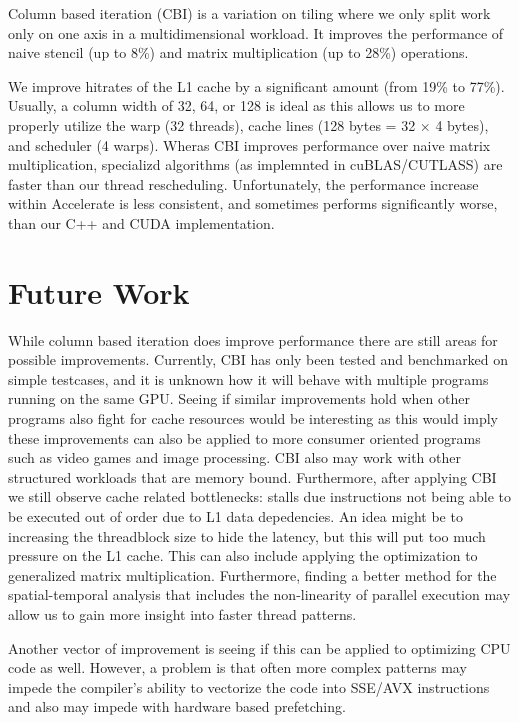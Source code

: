 Column based iteration (CBI) is a variation on tiling where we only split work only on one axis in a multidimensional workload. 
It improves the performance of naive stencil (up to 8\%) and matrix multiplication (up to 28\%) operations.

We improve hitrates of the L1 cache by a significant amount (from 19\% to 77\%).
Usually, a column width of 32, 64, or 128 is ideal as this allows us to more properly utilize the warp (32 threads), cache lines (128 bytes = 32 $\times$ 4 bytes), and scheduler (4 warps).
Wheras CBI improves performance over naive matrix multiplication, specializd algorithms (as implemnted in cuBLAS/CUTLASS) are faster than our thread rescheduling.
Unfortunately, the performance increase within Accelerate is less consistent, and sometimes performs significantly worse, than our C++ and CUDA implementation. 

\section{Future Work}
While column based iteration does improve performance there are still areas for possible improvements.
Currently, CBI has only been tested and benchmarked on simple testcases, and it is unknown how it will behave with multiple programs running on the same GPU.
Seeing if similar improvements hold when other programs also fight for cache resources would be interesting as this would imply these improvements can also be applied to more consumer oriented programs such as video games and image processing.
CBI also may work with other structured workloads that are memory bound.
Furthermore, after applying CBI we still observe cache related bottlenecks: stalls due instructions not being able to be executed out of order due to L1 data depedencies.
An idea might be to increasing the threadblock size to hide the latency, but this will put too much pressure on the L1 cache.
This can also include applying the optimization to generalized matrix multiplication.
Furthermore, finding a better method for the spatial-temporal analysis that includes the non-linearity of parallel execution may allow us to gain more insight into faster thread patterns.

Another vector of improvement is seeing if this can be applied to optimizing CPU code as well.
However, a problem is that often more complex patterns may impede the compiler's ability to vectorize the code into SSE/AVX instructions and also may impede with hardware based prefetching.
